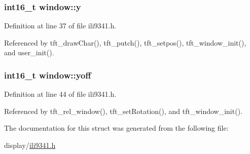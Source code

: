 \hypertarget{structwindow_a95c7023fc42e79ab42c291b90a490776}{
\subsubsection[{y}]{\setlength{\rightskip}{0pt plus 5cm}int16\-\_\-t window\-::y}}\label{structwindow_a95c7023fc42e79ab42c291b90a490776}


Definition at line 37 of file ili9341.\-h.



Referenced by tft\-\_\-draw\-Char(), tft\-\_\-putch(), tft\-\_\-setpos(), tft\-\_\-window\-\_\-init(), and user\-\_\-init().

\hypertarget{structwindow_a95c482caa25e4a283d962643d410bc29}{
\subsubsection[{yoff}]{\setlength{\rightskip}{0pt plus 5cm}int16\-\_\-t window\-::yoff}}\label{structwindow_a95c482caa25e4a283d962643d410bc29}


Definition at line 44 of file ili9341.\-h.



Referenced by tft\-\_\-rel\-\_\-window(), tft\-\_\-set\-Rotation(), and tft\-\_\-window\-\_\-init().



The documentation for this struct was generated from the following file\-:\begin{DoxyCompactItemize}
\item 
display/\hyperlink{ili9341_8h}{ili9341.\-h}\end{DoxyCompactItemize}
